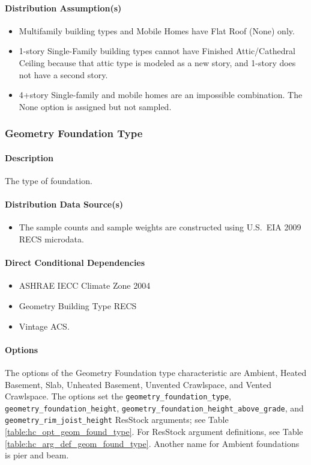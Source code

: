 \paragraph{Distribution Assumption(s)}
\begin{itemize}
    \item Multifamily building types and Mobile Homes have Flat Roof (None) only.
    \item 1-story Single-Family building types cannot have Finished Attic/Cathedral Ceiling because that attic type is modeled as a new story, and 1-story does not have a second story. 
    \item 4+story Single-family and mobile homes are an impossible combination. The None option is assigned but not sampled.
\end{itemize}

\subsubsection{Geometry Foundation Type} \label{geometry_foundation_type}
\paragraph{Description}
The type of foundation.

\paragraph{Distribution Data Source(s)}
\begin{itemize}
    \item The sample counts and sample weights are constructed using U.S.~EIA 2009 RECS microdata.
\end{itemize}

\paragraph{Direct Conditional Dependencies}
\begin{itemize}
    \item ASHRAE IECC Climate Zone 2004
    \item Geometry Building Type RECS
    \item Vintage ACS.
\end{itemize}

\paragraph{Options}
The options of the Geometry Foundation type characteristic are Ambient, Heated Basement, Slab, Unheated Basement, Unvented Crawlspace, and Vented Crawlspace. The options set the \texttt{geometry\_foundation\_type}, \texttt{geometry\_foundation\_height}, \texttt{geometry\_foundation\_height\_above\_grade}, and \texttt{geometry\_rim\_joist\_height} ResStock arguments; see Table \ref{table:hc_opt_geom_found_type}. For ResStock argument definitions, see Table \ref{table:hc_arg_def_geom_found_type}. Another name for Ambient foundations is pier and beam.

